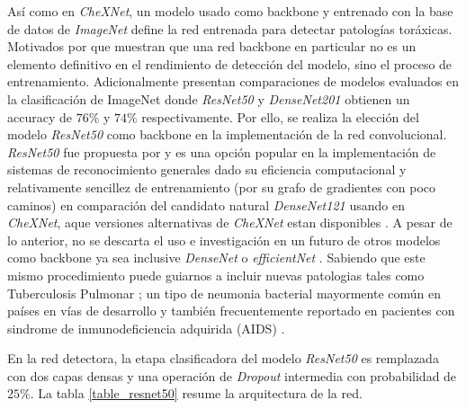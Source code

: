 {Así como en \textit{CheXNet}, un modelo usado como backbone y entrenado con la base de datos de
\textit{ImageNet} define la red entrenada para detectar patologías toráxicas. Motivados por
\citeauthor{bressem2020comparing, shazia2021comparative} que muestran que una red backbone en
particular no es un elemento definitivo en el rendimiento de detección del modelo, sino el proceso
de entrenamiento. Adicionalmente \citeauthor{huang2017densely, luo2020comparison} presentan
comparaciones de modelos evaluados en la clasificación de ImageNet donde \textit{ResNet50} y
\textit{DenseNet201} obtienen un accuracy de $76\%$ y $74\%$ respectivamente. Por ello, se realiza
la elección del modelo \textit{ResNet50} como backbone en la implementación de la red convolucional.
\textit{ResNet50} fue propuesta por \citeauthor{he2016deep} y es una opción popular en la
implementación de sistemas de reconocimiento generales dado su eficiencia computacional y relativamente
sencillez de entrenamiento (por su grafo de gradientes con poco caminos) en comparación del candidato
natural \textit{DenseNet121} usando en \textit{CheXNet}, aque versiones alternativas de
\textit{CheXNet} estan disponibles \cite{chexnet_code}. A pesar de lo anterior, no se descarta el uso
e investigación en un futuro de otros modelos como backbone ya sea inclusive \textit{DenseNet} o
\textit{efficientNet} \cite{tan2019efficientnet}. Sabiendo que este mismo procedimiento puede
guiarnos a incluir nuevas patologias tales como Tuberculosis Pulmonar \cite{stirenko2018chest}; un
tipo de neumonia bacterial mayormente común en países en vías de desarrollo y también frecuentemente
reportado en pacientes con sindrome de inmunodeficiencia adquirida (AIDS) \cite{matsuura2018tuberculous}.

En la red detectora, la etapa clasificadora del modelo \textit{ResNet50} es remplazada con dos capas
densas y una operación de \textit{Dropout} intermedia con probabilidad de $25\%$. La tabla
\ref{table_resnet50} resume la arquitectura de la red.

}
